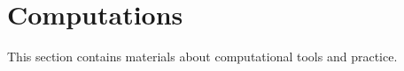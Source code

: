 \documentclass[../main.tex]{subfiles}
\begin{document}
\section{Computations}
This section contains materials about computational tools and practice.
\end{document}

